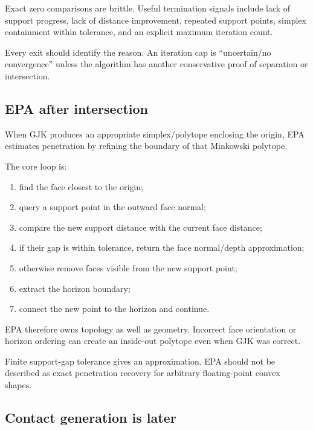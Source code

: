 Exact zero comparisons are brittle. Useful termination signals include lack of support progress, lack of distance improvement, repeated support points, simplex containment within tolerance, and an explicit maximum iteration count.

Every exit should identify the reason. An iteration cap is ``uncertain/no convergence'' unless the algorithm has another conservative proof of separation or intersection.

\subsection{EPA after intersection}\label{appendix-aef6177f7b3f-epa-after-intersection}

When GJK produces an appropriate simplex/polytope enclosing the origin, EPA estimates penetration by refining the boundary of that Minkowski polytope.

The core loop is:

\begin{enumerate}
\def\labelenumi{\arabic{enumi}.}
\tightlist
\item
  find the face closest to the origin;
\item
  query a support point in the outward face normal;
\item
  compare the new support distance with the current face distance;
\item
  if their gap is within tolerance, return the face normal/depth approximation;
\item
  otherwise remove faces visible from the new support point;
\item
  extract the horizon boundary;
\item
  connect the new point to the horizon and continue.
\end{enumerate}

EPA therefore owns topology as well as geometry. Incorrect face orientation or horizon ordering can create an inside-out polytope even when GJK was correct.

Finite support-gap tolerance gives an approximation. EPA should not be described as exact penetration recovery for arbitrary floating-point convex shapes.

\subsection{Contact generation is later}\label{appendix-aef6177f7b3f-contact-generation-is-later}

